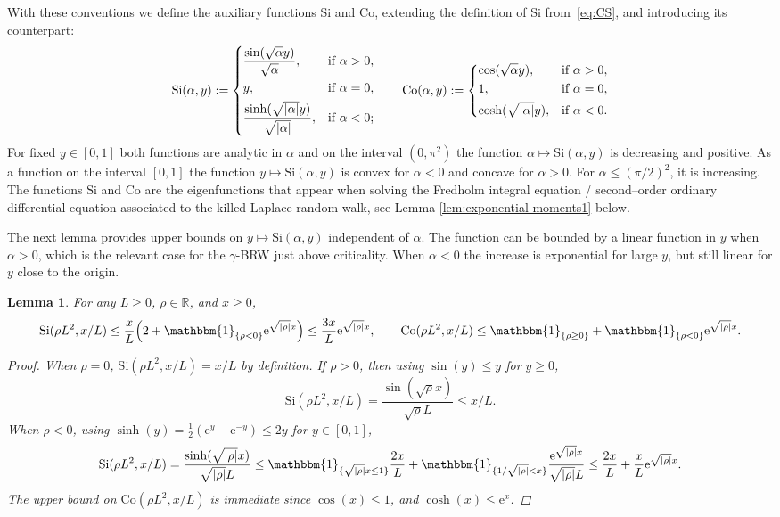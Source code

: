 \documentclass[a4paper, a4wide, 10pt, reqno]{amsart}
\theoremstyle{plain}
\newtheorem{lemma}[theorem]{Lemma}
\theoremstyle{definition}
\numberwithin{equation}{section}
\newcommand{\R}{{\mathbb R}}
\newcommand{\re}{{\mathrm e}}
\newcommand{\Co}{{\mathrm{Co}}}
\newcommand{\Si}{{\mathrm{Si}}}
\newcommand{\ind}[1]{\mathbbm{1}_{\{#1\}}}
\begin{document}
With these conventions we  define the auxiliary functions $\Si$ and $\Co$,  extending the definition of $\Si$ from~\eqref{eq:CS}, and introducing its counterpart:
\begin{equation}\label{eq:CSx}
    \Si(\alpha, y):=\begin{dcases}
        \frac{\sin(\sqrt{\alpha}y)}{\sqrt{\alpha}},&\text{if }\alpha>0,\\
        y,&\text{if }\alpha = 0,\\
        \frac{\sinh(\sqrt{|\alpha|}y)}{\sqrt{|\alpha|}},&\text{if }\alpha<0;
    \end{dcases}\qquad \Co(\alpha, y):=\begin{dcases}
        \cos(\sqrt{\alpha}y),&\text{if }\alpha>0,\\
        1,&\text{if }\alpha = 0,\\
        \cosh(\sqrt{|\alpha|}y),&\text{if }\alpha<0.
    \end{dcases}
\end{equation}
For fixed $y\in[0,1]$ both functions are analytic in $\alpha$ and on the interval $(0,\pi^2)$
the function
$\alpha\mapsto\Si(\alpha, y)$ is decreasing and positive. As a function on the interval $[0,1]$ the function $y\mapsto \Si(\alpha, y)$ is convex for $\alpha<0$ and concave for $\alpha>0$. For $\alpha\le(\pi/2)^2$,  it 
is increasing. 
The functions $\Si$ and $\Co$ are the eigenfunctions that appear when solving the Fredholm integral equation / second–order ordinary differential equation  associated to the killed Laplace random walk, see Lemma \ref{lem:exponential-moments1} below. 

\smallskip 
The next lemma provides upper bounds on $y\mapsto\Si(\alpha, y)$  independent of $\alpha$. The function can be bounded by a linear function in $y$ when $\alpha>0$, which is the relevant case for the $\gamma$-BRW just above criticality. When $\alpha<0$ the increase is exponential for large $y$, but still linear for $y$ close to the origin.

\begin{lemma}\label{lem:bound-si}
    For any $L\ge 0$, $\rho\in\R$, and  $x\ge 0$, 
    \[
    \Si(\rho L^2, x/L)\le \frac{x}{L}\Big(2+ \ind{\rho<0}\re^{\sqrt{|\rho|}x}\Big)\le \frac{3x}{L}\re^{\sqrt{|\rho|}x}, \qquad \Co(\rho L^2, x/L)\le \ind{\rho\ge 0}+\ind{\rho<0}\re^{\sqrt{|\rho|}x}.
    \]
    \begin{proof}
        When $\rho=0$, $\Si(\rho L^2, x/L)=x/L$ by definition. If $\rho>0$, then using $\sin(y)\le y$ for $y\ge 0$, 
        \[
        \Si(\rho L^2, x/L)= \frac{\sin(\sqrt{\rho}x)}{\sqrt{\rho} L}\le x/L.
        \]
        When $\rho<0$, using $\sinh(y)=\tfrac{1}{2}(\re^y-\re^{-y})\le 2y$ for $y\in[0,1]$,
        \[
        \Si(\rho L^2, x/L) = \frac{\sinh(\sqrt{|\rho|}x)}{\sqrt{|\rho|} L} \le \ind{\sqrt{|\rho|}x\le 1} \frac{2x}{L} + \ind{1/\sqrt{|\rho|}<x} \frac{\re^{\sqrt{|\rho|}x}}{\sqrt{|\rho|}L} \le \frac{2x}L + \frac{x}{L}\re^{\sqrt{|\rho|}x}.
        \]
        The upper bound on $\Co(\rho L^2, x/L)$ is immediate since $\cos(x)\le 1$, and $\cosh(x)\le \re^x$.
    \end{proof}
\end{lemma}
\end{document}
